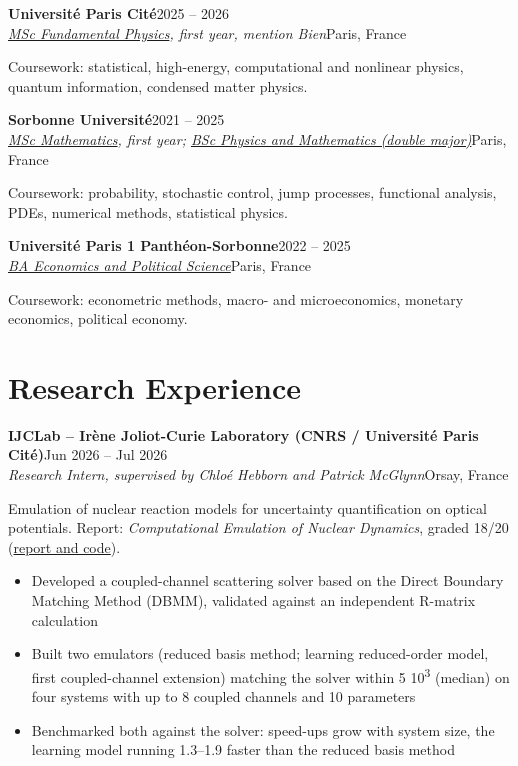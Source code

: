 \documentclass[a4paper,9pt]{extarticle}
\newcommand{\entry}[4]{%
  \textbf{#1}\hfill #4\\
  \textit{#3}\hfill {\color{muted}#2}\par}
\newcommand{\coursework}[1]{{\small\color{muted}Coursework: #1}\par\vspace{2pt}}
\begin{document}
\entry{Université Paris Cité}{Paris, France}{\href{https://odf.u-paris.fr/fr/offre-de-formation/master-XB/sciences-technologies-sante-STS/physique-fondamentale-et-applications-K2VO0C50/master-physique-fondamentale-et-applications-m1-parcours-physique-fondamentale-JS1X77U1.html}{MSc Fundamental Physics}, first year, \textit{mention Bien}}{2025 -- 2026}
\coursework{statistical, high-energy, computational and nonlinear physics, quantum information, condensed matter physics.}

\entry{Sorbonne Université}{Paris, France}{\href{https://sciences.sorbonne-universite.fr/en/Masters/masters-degree-mathematics-and-applications}{MSc Mathematics}, first year; \href{https://sciences.sorbonne-universite.fr/en/node/3647}{BSc Physics and Mathematics (double major)}}{2021 -- 2025}
\coursework{probability, stochastic control, jump processes, functional analysis, PDEs, numerical methods, statistical physics.}

\entry{Université Paris 1 Panthéon-Sorbonne}{Paris, France}{\href{https://formations.pantheonsorbonne.fr/fr/catalogue-des-formations/licence-L/licence-economie-KBTDQ2ZO/double-licence-economie-science-politique-KBTDWNWV.html}{BA Economics and Political Science}}{2022 -- 2025}
\coursework{econometric methods, macro- and microeconomics, monetary economics, political economy.}

\section*{Research Experience}

\entry{IJCLab – Irène Joliot-Curie Laboratory (CNRS / Université Paris Cité)}{Orsay, France}%
{Research Intern, supervised by Chloé Hebborn and Patrick McGlynn}{Jun 2026 -- Jul 2026}
Emulation of nuclear reaction models for uncertainty quantification on optical potentials.
Report: \textit{Computational Emulation of Nuclear Dynamics}, graded 18/20
(\href{https://github.com/mksv-pro/Mike-M1-Internship-IJCLab-2026}{report and code}).
\begin{itemize}
  \item Developed a coupled-channel scattering solver based on the Direct Boundary Matching Method (DBMM), validated against an independent R-matrix calculation
  \item Built two emulators (reduced basis method; learning reduced-order model, first coupled-channel extension) matching the solver within 5\,\texttimes\,10\textsuperscript{\textminus{}3} (median) on four systems with up to 8 coupled channels and 10 parameters
  \item Benchmarked both against the solver: speed-ups grow with system size, the learning model running 1.3–1.9\texttimes{} faster than the reduced basis method
\end{itemize}
\vspace{4pt}
\end{document}
